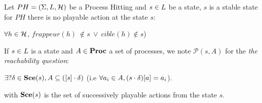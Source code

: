 \begin{definition}
\label{def:FixPoint2}
Let $PH = (\Sigma,L,\mathcal{H})$ be a Process Hitting and
$s \in L$ be a state, $s$ is a stable state for $PH$ there is no playable action at the state $s$: 
\begin{center}
$\forall h \in \mathcal{H}$, $frappeur(h) ~ \notin s ~ \vee ~ cible(h) \notin s$)
\end{center}
\end{definition}

\begin{definition}
\label{def:reachability}

 If $s \in L$ is a state and $A \in \mathbf{Proc}$ a set of processes, we note $\mathcal{P}(s, A)$ for the \emph{the reachability question}:
 \begin{center}
  $\exists? \delta \in \mathbf{Sce}(s), A \subseteq {([s]} \cdot \delta) $ (i.e $\forall a_i \in A, {(s \cdot \delta)[a]}=a_i$).
 \end{center}
with $\mathbf{Sce}(s)$ 
is the set of successively playable actions from the state $s$. 
\end{definition}


